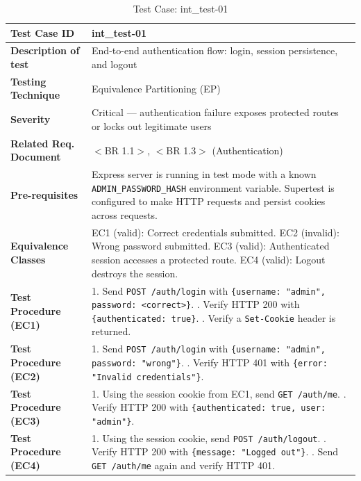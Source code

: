 \begin{table}[h!]
\centering
\caption{Test Case: int\_test-01}
\begin{tabular}{|p{}|p{}|}
\hline
\textbf{Test Case ID} & int\_test-01 \\ \hline
\textbf{Description of test} & End-to-end authentication flow: login, session persistence, and logout \\ \hline
\textbf{Testing Technique} & Equivalence Partitioning (EP) \\ \hline
\textbf{Severity} & Critical --- authentication failure exposes protected routes or locks out legitimate users \\ \hline
\textbf{Related Req. Document} & $<$BR 1.1$>$, $<$BR 1.3$>$ (Authentication) \\ \hline
\textbf{Pre-requisites} & Express server is running in test mode with a known \texttt{ADMIN\_PASSWORD\_HASH} environment variable. Supertest is configured to make HTTP requests and persist cookies across requests. \\ \hline
\textbf{Equivalence Classes} & EC1 (valid): Correct credentials submitted. \newline EC2 (invalid): Wrong password submitted. \newline EC3 (valid): Authenticated session accesses a protected route. \newline EC4 (valid): Logout destroys the session. \\ \hline
\textbf{Test Procedure (EC1)} & 1. Send \texttt{POST /auth/login} with \texttt{\{username: "admin", password: <correct>\}}. \newline 2. Verify HTTP 200 with \texttt{\{authenticated: true\}}. \newline 3. Verify a \texttt{Set-Cookie} header is returned. \\ \hline
\textbf{Test Procedure (EC2)} & 1. Send \texttt{POST /auth/login} with \texttt{\{username: "admin", password: "wrong"\}}. \newline 2. Verify HTTP 401 with \texttt{\{error: "Invalid credentials"\}}. \\ \hline
\textbf{Test Procedure (EC3)} & 1. Using the session cookie from EC1, send \texttt{GET /auth/me}. \newline 2. Verify HTTP 200 with \texttt{\{authenticated: true, user: "admin"\}}. \\ \hline
\textbf{Test Procedure (EC4)} & 1. Using the session cookie, send \texttt{POST /auth/logout}. \newline 2. Verify HTTP 200 with \texttt{\{message: "Logged out"\}}. \newline 3. Send \texttt{GET /auth/me} again and verify HTTP 401. \\ \hline

\end{tabular}
\end{table}

